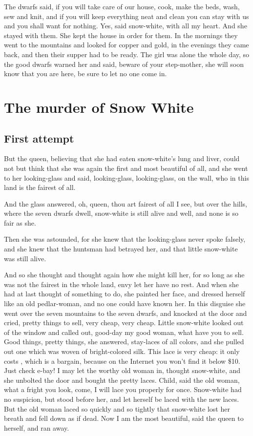 \documentclass[a4paper,11pt]{article}
\begin{document}
The dwarfs said, if you will take care of our house, cook, make
the beds, wash, sew and knit, and if you will keep everything neat
and clean you can stay with us and you shall want for nothing.
Yes, said snow-white, with all my heart.  And she stayed with
them.  She kept the house in order for them.  In the mornings
they went to the mountains and looked for copper and gold, in the
evenings they came back, and then their supper had to be ready.
The girl was alone the whole day, so the good dwarfs warned her
and said, beware of your step-mother, she will soon know that you
are here, be sure to let no one come in.


\section{The murder of Snow White}
\subsection{First attempt}

But the queen, believing that she had eaten snow-white's lung and
liver, could not but think that she was again the first and most
beautiful of all, and she went to her looking-glass and said,
looking-glass, looking-glass, on the wall,
          who in this land is the fairest of all.

And the glass answered,
          oh, queen, thou art fairest of all I see,
          but over the hills, where the seven dwarfs dwell,
          snow-white is still alive and well,
          and none is so fair as she.

Then she was astounded, for she knew that the looking-glass
never spoke falsely, and she knew that the huntsman had betrayed
her, and that little snow-white was still alive.

And so she thought and thought again how she might kill her,
for so long as she was not the fairest in the whole land, envy let
her have no rest.  And when she had at last thought of something
to do, she painted her face, and dressed herself like an old
pedlar-woman, and no one could have known her.  In this disguise
she went over the seven mountains to the seven dwarfs, and
knocked at the door and cried, pretty things to sell, very cheap,
very cheap.  Little snow-white looked out of the window and called
out, good-day my good woman, what have you to sell.  Good things,
pretty things, she answered, stay-laces of all colors, and she
pulled out one which was woven of bright-colored silk.  This lace
is very cheap: it only costs , which is a bargain, because on the
Internet you won't find it below \$10. Just check e-bay! I may let
the worthy old woman in, thought snow-white, and she unbolted the
door and bought the pretty laces.  Child, said the old woman,
what a fright you look, come, I will lace you properly for once.
Snow-white had no suspicion, but stood before her, and let herself
be laced with the new laces.  But the old woman laced so quickly
and so tightly that snow-white lost her breath and fell down as
if dead.  Now I am the most beautiful, said the queen to herself,
and ran away.
\end{document}
